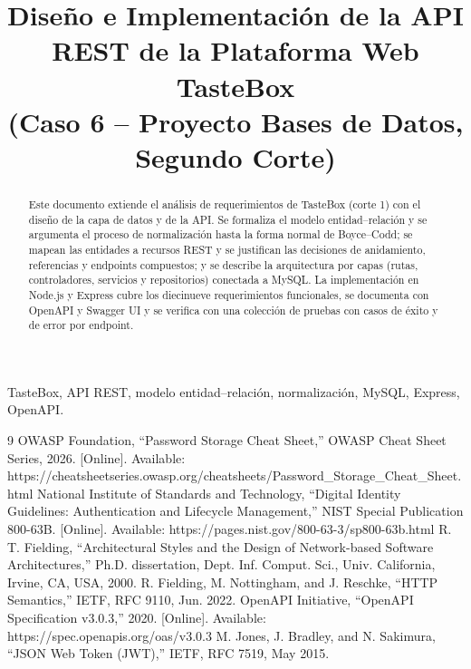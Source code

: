 \documentclass[conference]{IEEEtran}
\begin{document}
\title{Diseño e Implementación de la API REST de la Plataforma Web TasteBox\\
(Caso 6 -- Proyecto Bases de Datos, Segundo Corte)}

\author{
}

\maketitle

\begin{abstract}
Este documento extiende el análisis de requerimientos de TasteBox (corte 1) con el diseño de la capa de datos y de la API. Se formaliza el modelo entidad--relación y se argumenta el proceso de normalización hasta la forma normal de Boyce--Codd; se mapean las entidades a recursos REST y se justifican las decisiones de anidamiento, referencias y endpoints compuestos; y se describe la arquitectura por capas (rutas, controladores, servicios y repositorios) conectada a MySQL. La implementación en Node.js y Express cubre los diecinueve requerimientos funcionales, se documenta con OpenAPI y Swagger UI y se verifica con una colección de pruebas con casos de éxito y de error por endpoint.
\end{abstract}

\begin{IEEEkeywords}
TasteBox, API REST, modelo entidad--relación, normalización, MySQL, Express, OpenAPI.
\end{IEEEkeywords}

\setcounter{section}{12}



\begin{thebibliography}{9}
 OWASP Foundation, ``Password Storage Cheat Sheet,'' OWASP Cheat Sheet Series, 2026. [Online]. Available: https://cheatsheetseries.owasp.org/cheatsheets/Password\_Storage\_Cheat\_Sheet.html
 National Institute of Standards and Technology, ``Digital Identity Guidelines: Authentication and Lifecycle Management,'' NIST Special Publication 800-63B. [Online]. Available: https://pages.nist.gov/800-63-3/sp800-63b.html
 R. T. Fielding, ``Architectural Styles and the Design of Network-based Software Architectures,'' Ph.D. dissertation, Dept. Inf. Comput. Sci., Univ. California, Irvine, CA, USA, 2000.
 R. Fielding, M. Nottingham, and J. Reschke, ``HTTP Semantics,'' IETF, RFC 9110, Jun. 2022.
 OpenAPI Initiative, ``OpenAPI Specification v3.0.3,'' 2020. [Online]. Available: https://spec.openapis.org/oas/v3.0.3
 M. Jones, J. Bradley, and N. Sakimura, ``JSON Web Token (JWT),'' IETF, RFC 7519, May 2015.
\end{thebibliography}
\end{document}
